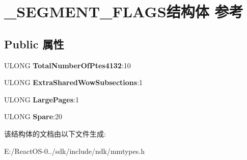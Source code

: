\hypertarget{struct___s_e_g_m_e_n_t___f_l_a_g_s}{}\section{\+\_\+\+S\+E\+G\+M\+E\+N\+T\+\_\+\+F\+L\+A\+G\+S结构体 参考}
\label{struct___s_e_g_m_e_n_t___f_l_a_g_s}
\subsection*{Public 属性}
\begin{DoxyCompactItemize}
\item 
\mbox{\label{struct___s_e_g_m_e_n_t___f_l_a_g_s_a956bbfabb073b8a2345ca815b6f79737}} 
U\+L\+O\+NG {\bfseries Total\+Number\+Of\+Ptes4132}\+:10
\item 
\mbox{\label{struct___s_e_g_m_e_n_t___f_l_a_g_s_a902069b782756b5caa44a0bd3e61e9cc}} 
U\+L\+O\+NG {\bfseries Extra\+Shared\+Wow\+Subsections}\+:1
\item 
\mbox{\label{struct___s_e_g_m_e_n_t___f_l_a_g_s_a05a83d5940bc468771ef4f6c3616b733}} 
U\+L\+O\+NG {\bfseries Large\+Pages}\+:1
\item 
\mbox{\label{struct___s_e_g_m_e_n_t___f_l_a_g_s_a77b8ef80c487b1b2ccb09463c51f631b}} 
U\+L\+O\+NG {\bfseries Spare}\+:20
\end{DoxyCompactItemize}


该结构体的文档由以下文件生成\+:\begin{DoxyCompactItemize}
\item 
E\+:/\+React\+O\+S-\/0../sdk/include/ndk/mmtypes.\+h\end{DoxyCompactItemize}
